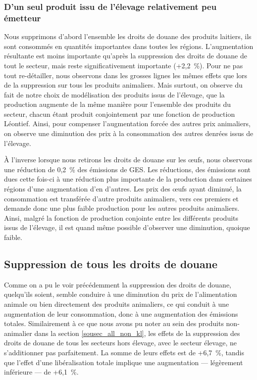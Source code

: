 \subsubsection{D'un seul produit issu de l'élevage relativement peu émetteur}

Nous supprimons d'abord l'ensemble les droits de douane des produits laitiers, ils sont consommés en quantités importantes dans toutes les régions. L'augmentation résultante est moins importante qu'après la suppression des droits de douane de tout le secteur, mais reste significativement importante (+2,2~\%). Pour ne pas tout re-détailler, nous observons dans les grosses lignes les mêmes effets que lors de la suppression sur tous les produits animaliers. Mais surtout, on observe du fait de notre choix de modélisation des produits issus de l'élevage, que la production augmente de la même manière pour l'ensemble des produits du secteur, chacun étant produit conjointement par une fonction de production Léontief. Ainsi, pour compenser l'augmentation forcée des autres prix animaliers, on observe une diminution des prix à la consommation des autres denrées issus de l'élevage.

À l'inverse lorsque nous retirons les droits de douane sur les œufs, nous observons une réduction de 0,2~\% des émissions de GES. Les réductions, des émissions sont dues cette fois-ci à une réduction plus importante de la production dans certaines régions d'une augmentation d'en d'autres. Les prix des œufs ayant diminué, la consommation est transférée d'autre produits animaliers, vers ces premiers et demande donc une plus faible production pour les autres produits animaliers. Ainsi, malgré la fonction de production conjointe entre les différents produits issus de l'élevage, il est quand même possible d'observer une diminution, quoique faible.


\subsection{Suppression de tous les droits de douane}

Comme on a pu le voir précédemment la suppression des droits de douane, quelqu'ils soient, semble conduire à une diminution du prix de l'alimentation animale ou bien directement des produits animaliers, ce qui conduit à une augmentation de leur consommation, donc à une augmentation des émissions totales. Similairement à ce que nous avons pu noter au sein des produits non-animalier dans la section \ref{sousec_all_non_kl}, les effets de la suppression des droits de douane de tous les secteurs hors élevage, avec le secteur élevage, ne s'additionner pas parfaitement. La somme de leurs effets est de +6,7~\%, tandis que l'effet d'une libéralisation totale implique une augmentation — légèrement inférieure — de +6,1~\%.

